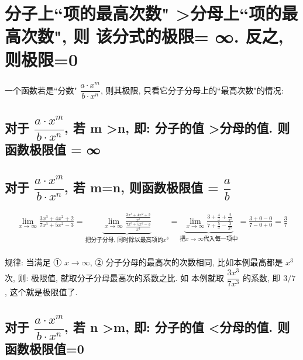\documentclass[UTF8]{ctexart}
\begin{document}
\section{分子上``项的最高次数" \textgreater 分母上``项的最高次数", 则 该分式的极限= ∞. 反之, 则极限=0}

一个函数若是``分数" $ \dfrac{a \cdot x^m}{b \cdot x^n} $, 则其极限, 只看它分子分母上的``最高次数"的情况:






\subsection{对于 $ \dfrac{a \cdot x^m}{b \cdot x^n} $, 若 m \textgreater n, 即: 分子的值 \textgreater 分母的值. 则函数极限值 = ∞}






\subsection{对于 $ \dfrac{a \cdot x^m}{b \cdot x^n} $, 若 m=n, 则函数极限值 = $ \dfrac{a} {b}$}

\begin{tcolorbox}[title = {例},boxrule={0.1em},colframe={black!10}, colback={black!3},colbacktitle={black!10},coltitle={black}]
	\begin{align*}  %
			\lim_{x\rightarrow \infty}\frac{3x^3+4x^2+2}{7x^3+5x^2-3}=\underset{\text{把分子分母,\ 同时除以最高项的}x^3}{\underbrace{\lim_{x\rightarrow \infty}\frac{\frac{3x^3+4x^2+2}{x^3}}{\frac{7x^3+5x^2-3}{x^3}}}}=\underset{\text{把}x\rightarrow \infty \text{代入每一项中}}{\underbrace{\lim_{x\rightarrow \infty}\frac{3+\frac{4}{x}+\frac{2}{x^3}}{7+\frac{5}{x}-\frac{3}{x^3}}}}=\frac{3+0-0}{7-0+0}=\frac{3}{7}\\
		\end{align*}
	
	规律: 当满足 ①  $x \rightarrow \infty$, ② 分子分母的最高次的次数相同, 比如本例最高都是 $x^3$ 次, 则: 极限值, 就取分子分母最高次的系数之比. 如 本例就取 $\dfrac{3 x^3} {7 x^3}$ 的系数, 即 $3/7$ , 这个就是极限值了.
\end{tcolorbox}




\subsection{对于 $ \dfrac{a \cdot x^m}{b \cdot x^n} $, 若 n \textgreater m, 即: 分子的值 \textless 分母的值. 则函数极限值=0}
\end{document}
